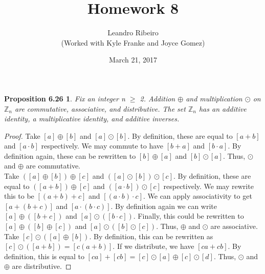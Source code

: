 \documentclass[12pt]{amsart}
\newcommand{\Z}{\mathbb{Z}}
\begin{document}
\title{Homework 8}
\date{March 21, 2017}
\author{Leandro Ribeiro\\(Worked with Kyle Franke and Joyce Gomez)}

\maketitle

\newtheorem*{prop6.26}{Proposition 6.26}
\begin{prop6.26}
	Fix an integer n $\geq$ 2. Addition $\oplus$ and multiplication $\odot$ on $\Z_n$ are
commutative, associative, and distributive. The set $\Z_n$ has an additive identity, a
multiplicative identity, and additive inverses.
\end{prop6.26}

\begin{proof}
	Take $[a] \oplus [b]$ and $[a] \odot [b]$. By definition, these are equal to $[a + b]$ and $[a \cdot b]$ respectively. We may commute to have $[b + a]$ and $[b \cdot a]$. By definition again, these can be rewritten to $[b] \oplus [a]$ and $[b] \odot [a]$. Thus, $\odot$ and $\oplus$ are commutative.
	\\\indent Take $([a] \oplus [b]) \oplus [c]$ and $([a] \odot [b]) \odot [c]$. By definition, these are equal to $([a + b]) \oplus [c]$ and $([a \cdot b]) \odot [c]$ respectively. We may rewrite this to be $[(a + b) + c]$ and $[(a \cdot b) \cdot c]$. We can apply associativity to get $[a + (b + c)]$ and $[a \cdot (b \cdot c)]$. By definition again we can write $[a] \oplus ([b + c])$ and $[a] \odot ([b \cdot c])$. Finally, this could be rewritten to $[a] \oplus ([b] \oplus [c])$ and $[a] \odot ([b] \odot [c])$. Thus, $\oplus$ and $\odot$ are associative.
	\\\indent Take $[c] \odot ([a] \oplus [b])$. By definition, this can be rewritten as $[c] \odot ([a + b]) = [c(a + b)]$. If we distribute, we have $[ca + cb]$. By definition, this is equal to $[ca] + [cb] = [c] \odot [a] \oplus [c] \odot [d]$. Thus, $\odot$ and $\oplus$ are distributive.
\end{proof}
\end{document}
